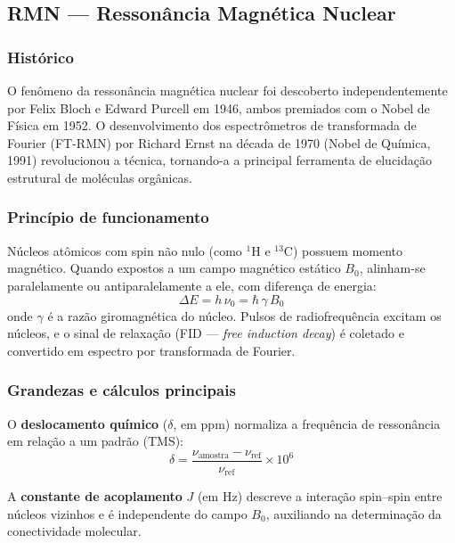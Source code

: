 \subsection{RMN --- Ressonância Magnética Nuclear}

\subsubsection*{Histórico}

O fenômeno da ressonância magnética nuclear foi descoberto independentemente
por Felix Bloch e Edward Purcell em 1946, ambos premiados com o Nobel de
Física em 1952. O desenvolvimento dos espectrômetros de transformada de
Fourier (FT-RMN) por Richard Ernst na década de 1970 (Nobel de Química,
1991) revolucionou a técnica, tornando-a a principal ferramenta de
elucidação estrutural de moléculas orgânicas.

\subsubsection*{Princípio de funcionamento}

Núcleos atômicos com spin não nulo (como $^1$H e $^{13}$C) possuem momento
magnético. Quando expostos a um campo magnético estático $B_0$, alinham-se
paralelamente ou antiparalelamente a ele, com diferença de energia:
\begin{equation}
    \Delta E = h\,\nu_0 = \hbar\,\gamma\,B_0
\end{equation}
onde $\gamma$ é a razão giromagnética do núcleo. Pulsos de radiofrequência
excitam os núcleos, e o sinal de relaxação (FID --- \textit{free induction
decay}) é coletado e convertido em espectro por transformada de Fourier.

\subsubsection*{Grandezas e cálculos principais}

O \textbf{deslocamento químico} ($\delta$, em ppm) normaliza a frequência
de ressonância em relação a um padrão (TMS):
\begin{equation}
    \delta = \frac{\nu_{\text{amostra}} - \nu_{\text{ref}}}{\nu_{\text{ref}}} \times 10^6
\end{equation}

A \textbf{constante de acoplamento} $J$ (em Hz) descreve a interação
spin--spin entre núcleos vizinhos e é independente do campo $B_0$,
auxiliando na determinação da conectividade molecular.

